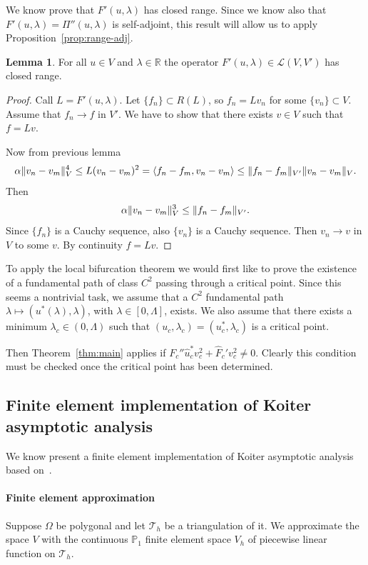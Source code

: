 \documentclass[a4paper,11pt]{article}
\theoremstyle{definition}
\newtheorem{lemma}[prop]{Lemma}
\DeclarePairedDelimiter{\norm}{\lVert}{\rVert}
\DeclarePairedDelimiter{\dual}{\langle}{\rangle}
\begin{document}
We know prove that $F'(u,\lambda)$ has closed range. Since we know also that $F'(u,\lambda)=\Pi''(u,\lambda)$ is self-adjoint, this result will allow us to apply Proposition~\ref{prop:range-adj}.
\begin{lemma}
For all $u\in V$ and $\lambda\in\mathbb{R}$ the operator $F'(u,\lambda)\in\mathscr{L}(V,V')$ has closed range.
\end{lemma}
\begin{proof}
Call $L=F'(u,\lambda)$. Let $\{f_n\}\subset R(L)$, so $f_n=Lv_n$ for some $\{v_n\}\subset V$. Assume that $f_n\to f$ in $V'$. We have to show that there exists $v\in V$ such that $f=Lv$.

Now from previous lemma
\[
\alpha\norm{v_n-v_m}_V^4\le L(v_n-v_m)^2=\dual{f_n-f_m,v_n-v_m}\le\norm{f_n-f_m}_{V'}\norm{v_n-v_m}_V. 
\]
Then
\[
\alpha\norm{v_n-v_m}_V^3\le\norm{f_n-f_m}_{V'}.
\]
Since $\{f_n\}$ is a Cauchy sequence, also $\{v_n\}$ is a Cauchy sequence. Then $v_n\to v$ in $V$ to some $v$. By continuity $f=Lv$.
\end{proof}

To apply the local bifurcation theorem we would first like to prove the existence of a fundamental path of class $C^2$ passing through a critical point. Since this seems a nontrivial task, we assume that a $C^2$ fundamental path $\lambda\mapsto(u^*(\lambda),\lambda)$, with $\lambda\in[0,\Lambda]$, exists. We also assume that there exists a minimum $\lambda_c\in(0,\Lambda)$ such that $(u_c,\lambda_c)=(u_c^*,\lambda_c)$ is a critical point.

Then Theorem~\ref{thm:main} applies if $F_c''\hat{u}_c^*v_c^2+\hat{F}_c'v_c^2\neq0$. Clearly this condition must be checked once the critical point has been determined.

\subsection{Finite element implementation of Koiter asymptotic analysis}

We know present a finite element implementation of Koiter asymptotic analysis based on~\cite{casciaro}.

\paragraph{Finite element approximation} Suppose $\Omega$ be polygonal and let $\mathscr{T}_h$ be a triangulation of it. We approximate the space $V$ with the continuous $\mathbb{P}_1$ finite element space $V_h$ of piecewise linear function on $\mathscr{T}_h$.
\end{document}
